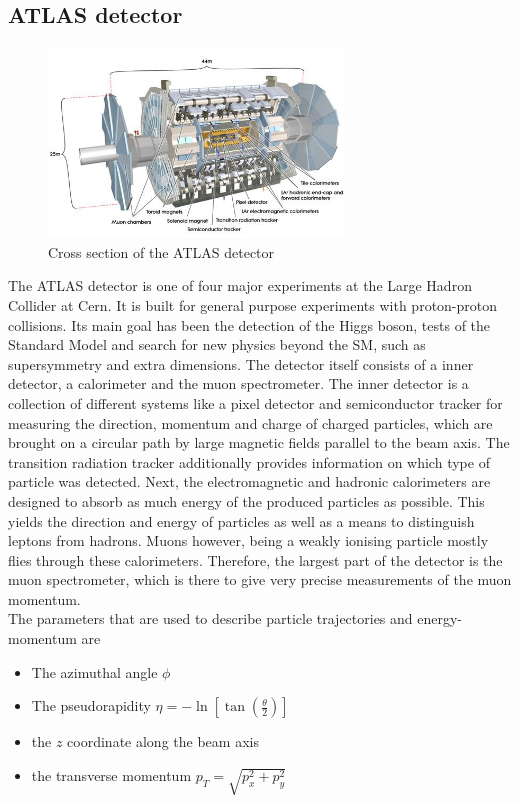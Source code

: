 \documentclass[twoside,        %
               BCOR12mm,       %
               ngerman,english, %
               fleqn,headsepline=false,footsepline=false
              ]{Vorlage/MFPREPORT}
\begin{document}
\subsection{ATLAS detector}
\begin{figure}[h!]
    \centering
    \includegraphics[width=0.7\textwidth]{fig/atlas}
\caption{Cross section of the ATLAS detector \cite{atlas}}
    \label{fig:atlas}
\end{figure}
The ATLAS detector is one of four major experiments at the Large Hadron
Collider at Cern. It is built for general purpose experiments with
proton-proton collisions. Its main goal has been the detection of the Higgs
boson, tests of the Standard Model and search for new physics beyond the SM,
such as supersymmetry and extra dimensions.
The detector itself consists of a inner detector, a calorimeter and the muon
spectrometer. The inner detector is a collection of different systems like a
pixel detector and semiconductor tracker for measuring the direction, momentum
and charge of charged particles, which are brought on a circular path by large
magnetic fields parallel to the beam axis. The transition radiation tracker
additionally provides information on which type of particle was detected. Next,
the electromagnetic and hadronic calorimeters are designed to absorb as much
energy of the produced particles as possible. This yields the direction and
energy of particles as well as a means to distinguish leptons from hadrons. 
Muons however, being a weakly ionising particle mostly flies through these
calorimeters. Therefore, the largest part of the detector is the muon
spectrometer, which is there to give very precise measurements of the muon
momentum.\\
The parameters that are used to describe particle trajectories and
energy-momentum are
\begin{itemize}
    \item The azimuthal angle $\phi$
    \item The pseudorapidity $\eta=-\ln\left[ \tan \left( \frac{\theta}{2}
        \right) \right]$
    \item the $z$ coordinate along the beam axis
    \item the transverse momentum $p_T=\sqrt{p_x^2+p_y^2}$
        
\end{itemize}
\end{document}
